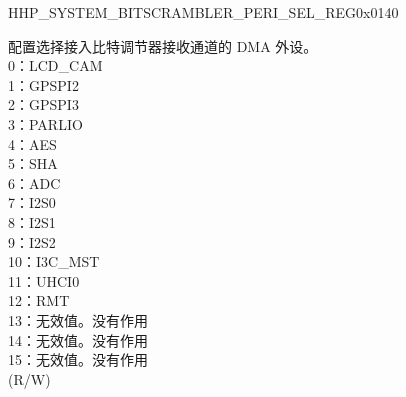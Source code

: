 \begin{register}{H}{HP\_SYSTEM\_BITSCRAMBLER\_PERI\_SEL\_REG}{0x0140}\label{regdesc:HPSYSTEMBITSCRAMBLERPERISELREG}
%
%
%
\regnewline%
\begin{regdesc}\begin{reglist}
\label{fielddesc:HPSYSTEMBITSCRAMBLERPERIRXSEL}\item [HP\_SYSTEM\_BITSCRAMBLER\_PERI\_RX\_SEL] 配置选择接入比特调节器接收通道的 DMA 外设。\\
0：LCD\_CAM \\
1：GPSPI2 \\
2：GPSPI3 \\
3：PARLIO \\
4：AES \\
5：SHA \\
6：ADC \\
7：I2S0 \\
8：I2S1 \\
9：I2S2 \\
10：I3C\_MST \\
11：UHCI0 \\
12：RMT \\
13：无效值。没有作用\\
14：无效值。没有作用\\
15：无效值。没有作用\\
(R/W)
\item [见下页...]
\end{reglist}\end{regdesc}
\end{register}
\addtocounter{Regfloat}{-1}


